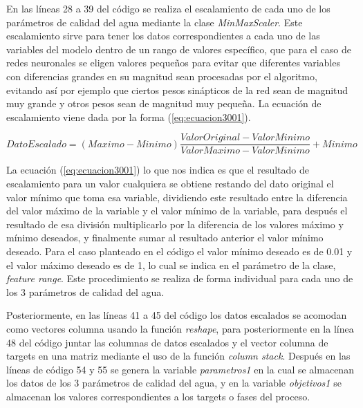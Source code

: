 En las líneas 28 a 39 del código se realiza el escalamiento de cada uno de los parámetros de calidad del agua mediante la clase \textit{MinMaxScaler}. Este escalamiento sirve para tener los datos correspondientes a cada 
uno de las variables del modelo dentro de un rango de valores específico, que para el caso de redes neuronales se eligen valores pequeños para evitar que diferentes variables con diferencias grandes en su magnitud sean 
procesadas por el algoritmo, evitando así por ejemplo que ciertos pesos sinápticos de la red sean de magnitud muy grande y otros pesos sean de magnitud muy pequeña. La ecuación de escalamiento viene dada por la forma (\ref{eq:ecuacion3001}).

\begin{equation}
	Dato Escalado=(Maximo - Minimo) \frac{Valor Original - Valor Minimo}{Valor Maximo - Valor Minimo} + Minimo
	\label{eq:ecuacion3001}
\end{equation}

La ecuación (\ref{eq:ecuacion3001}) lo que nos indica es que el resultado de escalamiento para un valor cualquiera se obtiene restando del dato original el valor mínimo que toma esa variable, dividiendo este resultado entre la diferencia 
del valor máximo de la variable y el valor mínimo de la variable, para después el resultado de esa división multiplicarlo por la diferencia de los valores máximo y mínimo deseados, y finalmente sumar al resultado anterior 
el valor mínimo deseado. Para el caso planteado en el código el valor mínimo deseado es de 0.01 y el valor máximo deseado es de 1, lo cual se indica en el parámetro de la clase, \textit{feature range}. Este procedimiento 
se realiza de forma individual para cada uno de los 3 parámetros de calidad del agua. 

Posteriormente, en las líneas 41 a 45 del código los datos escalados se acomodan como vectores columna usando la función \textit{reshape}, para posteriormente en la línea 48 del código juntar las columnas de datos escalados 
y el vector columna de targets en una matriz mediante el uso de la función \textit{column stack}. Después en las líneas de código 54 y 55 se genera la variable \textit{parametros1} en la cual se almacenan los datos de los 
3 parámetros de calidad del agua, y en la variable \textit{objetivos1} se almacenan los valores correspondientes a los targets o fases del proceso.

